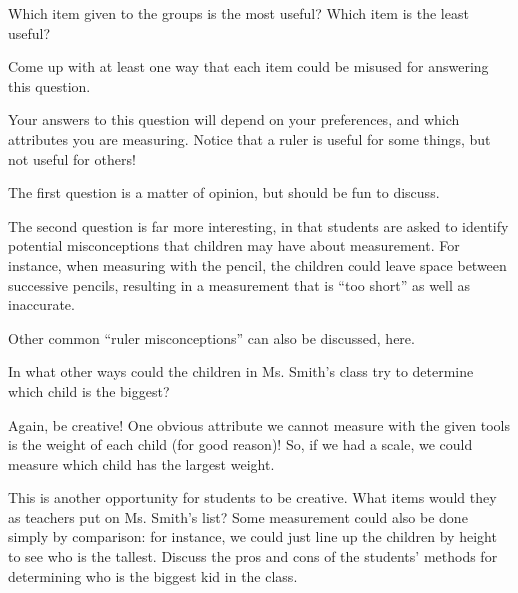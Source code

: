 \documentclass[]{ximera}
\begin{document}
\begin{problem}
    Which item given to the groups is the most useful?  Which item is the least useful?
    
    Come up with at least one way that each item could be misused for answering this question.
    
    \begin{solution}
    Your answers to this question will depend on your preferences, and which attributes you are measuring.  Notice that a ruler is useful for some things, but not useful for others!
    \end{solution}
    
    \begin{instructorNotes}
        The first question is a matter of opinion, but should be fun to discuss.  
        
        The second question is far more interesting, in that students are asked to identify potential misconceptions that children may have about measurement.  For instance, when measuring with the pencil, the children could leave space between successive pencils, resulting in a measurement that is ``too short'' as well as inaccurate.  
        
        Other common ``ruler misconceptions'' can also be discussed, here.
    \end{instructorNotes}
\end{problem}

\begin{problem}
    In what other ways could the children in Ms. Smith's class try to determine which child is the biggest?
    
    \begin{solution}
        Again, be creative!  One obvious attribute we cannot measure with the given tools is the weight of each child (for good reason)!  So, if we had a scale, we could measure which child has the largest weight.
    \end{solution}
    
    \begin{instructorNotes}
        This is another opportunity for students to be creative.  What items would they as teachers put on Ms. Smith's list?  Some measurement could also be done simply by comparison: for instance, we could just line up the children by height to see who is the tallest.  Discuss the pros and cons of the students' methods for determining who is the biggest kid in the class.
    \end{instructorNotes}
\end{problem}
\end{document}
